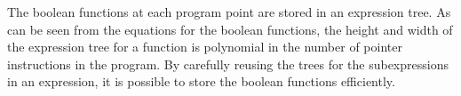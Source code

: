 The boolean functions at each program point are stored in an
expression tree.  As can be seen from the equations for the
boolean functions, the height and width of the expression
tree for a function is polynomial in the number of pointer
instructions in the program. By carefully reusing the trees
for the subexpressions in an expression, it is possible to
store the boolean functions efficiently.


